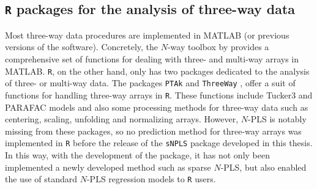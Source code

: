 \subsection{\texttt{R} packages for the analysis of three-way data}
Most three-way data procedures are implemented in MATLAB\textsuperscript{\tiny\textregistered} \textcite{MATLAB:2010} (or previous versions of the software). Concretely, the $N$-way toolbox by \textcite{andersson2000n} provides a comprehensive set of functions for dealing with three- and multi-way arrays in MATLAB\textsuperscript{\tiny\textregistered}. \texttt{R}, on the other hand, only has two packages dedicated to the analysis of three- or multi-way data. The packages \texttt{PTAk} \parencite{leibovici2010spatio} and \texttt{ThreeWay} \parencite{giordani2014three}, offer a suit of functions for handling three-way arrays in \texttt{R}. These functions include Tucker3 and PARAFAC models and also some processing methods for three-way data such as centering, scaling, unfolding and normalizing arrays. However, $N$-PLS is notably missing from these packages, so no prediction method for three-way arrays was implemented in \texttt{R} before the release of the \texttt{sNPLS} package developed in this thesis. In this way, with the development of the package, it has not only been implemented a newly developed method such as sparse $N$-PLS, but also enabled the use of standard $N$-PLS regression models to \texttt{R} users.